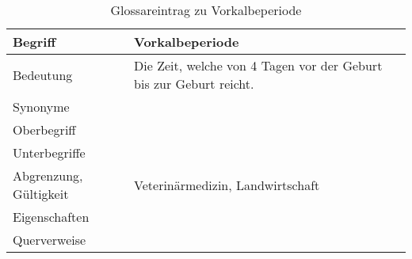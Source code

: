 \begin{table}[h]
	\centering	
	\begin{tabular}{ p{4.5cm} p{10.5cm} } 
		\toprule[1pt]
		\rowcolor{maroon!30}

		\textbf{Begriff} &  \textbf{Vorkalbeperiode} \\		
		\midrule
	
		Bedeutung  & Die Zeit, welche von 4 Tagen vor der Geburt bis zur Geburt reicht.\\		
		Synonyme  &\\				
		Oberbegriff  &  \\		
		Unterbegriffe   & \\		
		Abgrenzung, Gültigkeit  & Veterinärmedizin, Landwirtschaft\\			
		Eigenschaften  & \\				
		Querverweise  & \\	
		\bottomrule				
		
	\end{tabular}
	\label{tab: Glossareintrag zu Vorkalbeperiode}
	\caption{Glossareintrag zu Vorkalbeperiode}
\end{table}


